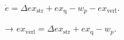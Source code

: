 \( \dot{e} = \Delta ex_{\text{str}} + ex_{\text{q}} - w_p - ex_{\text{verl}} \).  

→ \( ex_{\text{verl}} = \Delta ex_{\text{str}} + ex_{\text{q}} - w_p \).